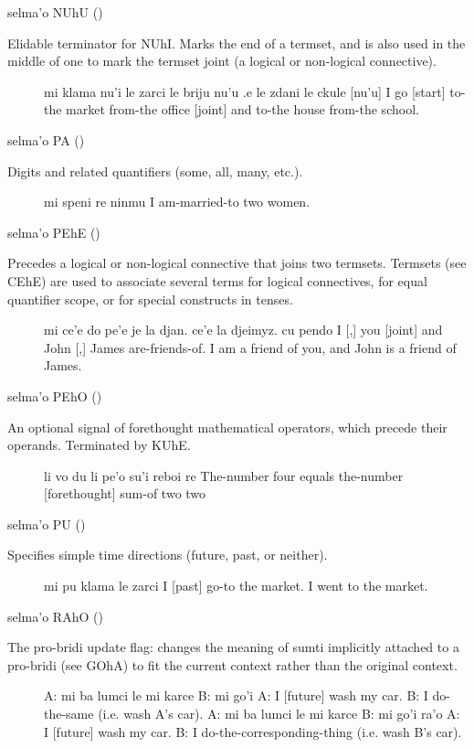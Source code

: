 selma'o NUhU () 

Elidable terminator for NUhI. Marks the end of a termset,
    and is also used in the middle of one to mark the termset joint
    (a logical or non-logical connective).
\begin{description}
\item[] mi klama nu'i le zarci le briju nu'u .e le zdani le ckule [nu'u] I go [start] to-the market from-the office [joint] and to-the house from-the school.
\end{description}

selma'o PA () 

Digits and related quantifiers (some, all, many, etc.).
\begin{description}
\item[] mi speni re ninmu I am-married-to two women.
\end{description}

selma'o PEhE () 

Precedes a logical or non-logical connective that joins two
    termsets. Termsets (see CEhE) are used to associate several
    terms for logical connectives, for equal quantifier scope, or
    for special constructs in tenses.
\begin{description}
\item[] mi ce'e do pe'e je la djan. ce'e la djeimyz. cu pendo I [,] you [joint] and John [,] James are-friends-of. I am a friend of you, and John is a friend of James.
\end{description}

selma'o PEhO () 

An optional signal of forethought mathematical operators,
    which precede their operands. Terminated by KUhE.
\begin{description}
\item[] li vo du li pe'o su'i reboi re The-number four equals the-number [forethought] sum-of two two
\end{description}

selma'o PU () 

Specifies simple time directions (future, past, or
    neither).
\begin{description}
\item[] mi pu klama le zarci I [past] go-to the market. I went to the market.
\end{description}

selma'o RAhO () 

The pro-bridi update flag: changes the meaning of sumti
    implicitly attached to a pro-bridi (see GOhA) to fit the
    current context rather than the original context.
\begin{description}
\item[] A: mi ba lumci le mi karce B: mi go'i A: I [future] wash my car. B: I do-the-same (i.e. wash A's car). A: mi ba lumci le mi karce B: mi go'i ra'o A: I [future] wash my car. B: I do-the-corresponding-thing (i.e. wash B's car).
\end{description}

